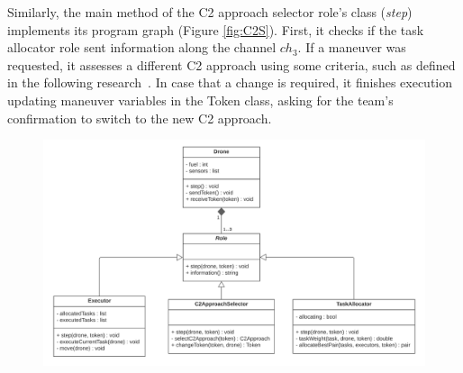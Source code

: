 Similarly, the main method of the C2 approach selector role's class (\textit{step}) implements its program graph (Figure \ref{fig:C2S}). First, it checks if the task allocator role sent information along the channel $ch_3$. If a maneuver was requested, it assesses a different C2 approach using some criteria, such as defined in the following research~\cite{france2014}. In case that a change is required, it finishes execution updating maneuver variables in the Token class, asking for the team's confirmation to switch to the new C2 approach.

\begin{figure}
  \centering
  \includegraphics[width=0.95\linewidth]{figures/diagramaDeClasse.png}
  \label{fig:ClassDiagram}
\end{figure}





